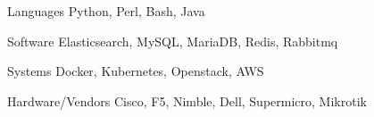 
\begin{cvskills}

  \cvskill
    {Languages} %
    {Python, Perl, Bash, Java} %

  \cvskill
    {Software} %
    {Elasticsearch, MySQL, MariaDB, Redis, Rabbitmq} %
    
  \cvskill
    {Systems} %
    {Docker, Kubernetes, Openstack, AWS} %
    
  \cvskill
    {Hardware/Vendors} %
    {Cisco, F5, Nimble, Dell, Supermicro, Mikrotik} %

\end{cvskills}


